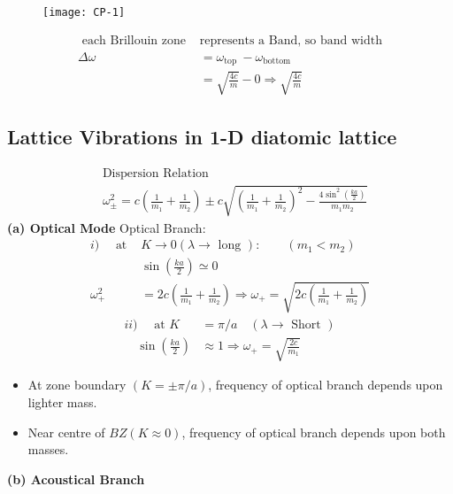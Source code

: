 \begin{figure}[H]
	\centering
	\texttt{[image: CP-1]}
\end{figure}
\begin{align*}
\text { each Brillouin zone  }&\text{represents a Band, so band width}\\
\Delta \omega &=\omega_{\text {top }}-\omega_{\text {bottom }} \\
&=\sqrt{\frac{4 c}{m}}-0 \Rightarrow \sqrt{\frac{4 c}{m}}
\end{align*}
\subsection{Lattice Vibrations in 1-D diatomic lattice}
\begin{align*}
&\text{Dispersion Relation}\\
&\omega_{\pm}^{2}=c\left(\frac{1}{m_{1}}+\frac{1}{m_{2}}\right) \pm c \sqrt{\left(\frac{1}{m_{1}}+\frac{1}{m_{2}}\right)^{2}-\frac{4 \sin ^{2}\left(\frac{k a}{2}\right)}{m_{1} m_{2}}}
\end{align*}
\textbf{(a) Optical Mode}
Optical Branch:
\begin{align*}
i)\quad \text { at }& K \rightarrow 0(\lambda \rightarrow \text { long }):\qquad\left(m_{1}<m_{2}\right)\\
&\sin \left(\frac{k a}{2}\right) \simeq 0\\
\omega_{+}^{2}&=2 c\left(\frac{1}{m_{1}}+\frac{1}{m_{2}}\right) \Rightarrow \omega_{+}=\sqrt{2 c\left(\frac{1}{m_{1}}+\frac{1}{m_{2}}\right)}
\end{align*}
\begin{align*}
ii)\quad \text { at } K&=\pi/a \quad(\lambda \rightarrow \text { Short })\\
\quad\sin \left(\frac{k a}{2}\right) &\approx 1 \Rightarrow \omega_{+}=\sqrt{\frac{2 c}{m_{1}}}
\end{align*}
\begin{itemize}
	\item At zone boundary $(K=\pm \pi/a)$, frequency of optical branch depends upon lighter mass.\item
Near centre of $BZ(K\approx 0)$, frequency of optical branch depends upon both masses.
\end{itemize}
\textbf{(b) Acoustical Branch}
